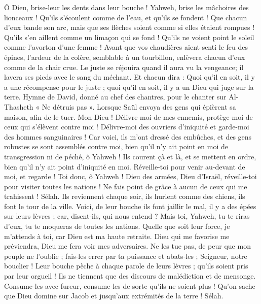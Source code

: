 \begin{multicols}{2}
Ô Dieu, brise-leur les dents dans leur bouche ! Yahweh, brise les mâchoires des lionceaux !
Qu'ils s'écoulent comme de l'eau, et qu'ils se fondent ! Que chacun d'eux bande son arc, mais que ses flèches soient comme si elles étaient rompues !
Qu'ils s'en aillent comme un limaçon qui se fond ! Qu'ils ne voient point le soleil comme l'avorton d'une femme !
Avant que vos chaudières aient senti le feu des épines, l'ardeur de la colère, semblable à un tourbillon, enlèvera chacun d'eux comme de la chair crue.
Le juste se réjouira quand il aura vu la vengeance; il lavera ses pieds avec le sang du méchant.
Et chacun dira : Quoi qu'il en soit, il y a une récompense pour le juste ; quoi qu'il en soit, il y a un Dieu qui juge sur la terre.
\VerseOne{}Hymne de David, donné au chef des chantres, pour le chanter sur Al-Thasheth « Ne détruis pas ». Lorsque Saül envoya des gens qui épièrent sa maison, afin de le tuer.
Mon Dieu ! Délivre-moi de mes ennemis, protège-moi de ceux qui s'élèvent contre moi !
Délivre-moi des ouvriers d'iniquité et garde-moi des hommes sanguinaires !
Car voici, ils m'ont dressé des embûches, et des gens robustes se sont assemblés contre moi, bien qu'il n'y ait point en moi de transgression ni de péché, ô Yahweh !
Ils courent çà et là, et se mettent en ordre, bien qu'il n'y ait point d'iniquité en moi. Réveille-toi pour venir au-devant de moi, et regarde !
Toi donc, ô Yahweh ! Dieu des armées, Dieu d'Israël, réveille-toi pour visiter toutes les nations ! Ne fais point de grâce à aucun de ceux qui me trahissent ! Sélah.
Ils reviennent chaque soir, ils hurlent comme des chiens, ils font le tour de la ville.
Voici, de leur bouche ils font jaillir le mal, il y a des épées sur leurs lèvres ; car, disent-ils, qui nous entend ?
Mais toi, Yahweh, tu te riras d'eux, tu te moqueras de toutes les nations.
Quelle que soit leur force, je m'attends à toi, car Dieu est ma haute retraite.
Dieu qui me favorise me préviendra, Dieu me fera voir mes adversaires.
Ne les tue pas, de peur que mon peuple ne l'oublie ; fais-les errer par ta puissance et abats-les ; Seigneur, notre bouclier !
Leur bouche pèche à chaque parole de leurs lèvres ; qu'ils soient pris par leur orgueil ! Ils ne tiennent que des discours de malédiction et de mensonge.
Consume-les avec fureur, consume-les de sorte qu'ils ne soient plus ! Qu'on sache que Dieu domine sur Jacob et jusqu'aux extrémités de la terre ! Sélah.

\end{multicols}
